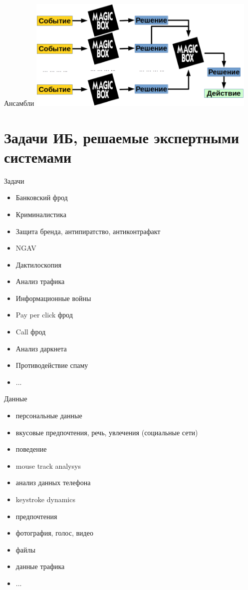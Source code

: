   \begin{frame}{Ансамбли}
  \includegraphics[width=11cm]{../pic/ensemble_example.png}
  \end{frame}

  \section{Задачи ИБ, решаемые экспертными системами}\label{section:is_tasks}
	
  \begin{frame}{Задачи}
  \begin{itemize}
  	\item Банковский фрод
  	\item Криминалистика
  	\item Защита бренда, антипиратство, антиконтрафакт
  	\item NGAV
  	\item Дактилоскопия
  	\item Анализ трафика
  	\item Информационные войны
  	\item Pay per click фрод
  	\item Call фрод
  	\item Анализ даркнета
  	\item Противодействие спаму
  	\item ...
  \end{itemize} 
  \end{frame}
 
  \begin{frame}{Данные}
  \begin{itemize}
     \item персональные данные
     \item вкусовые предпочтения, речь, увлечения (социальные сети)
     \item поведение
     \item mouse track analysys 
     \item анализ данных телефона
     \item keystroke dynamics
     \item предпочтения
     \item фотография, голос, видео
     \item файлы
     \item данные трафика
     \item ...
  \end{itemize}
  \end{frame}  


